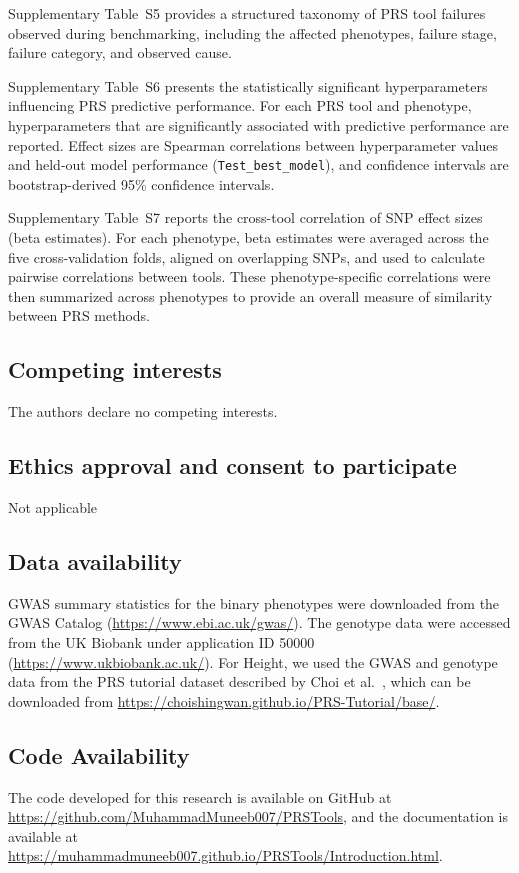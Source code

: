 \documentclass[pdflatex,sn-basic]{sn-jnl}
\begin{document}
Supplementary Table~S5 provides a structured taxonomy of PRS tool failures observed during benchmarking, including the affected phenotypes, failure stage, failure category, and observed cause.

Supplementary Table~S6 presents the statistically significant hyperparameters influencing PRS predictive performance. For each PRS tool and phenotype, hyperparameters that are significantly associated with predictive performance are reported. Effect sizes are Spearman correlations between hyperparameter values and held-out model performance (\texttt{Test\_best\_model}), and confidence intervals are bootstrap-derived 95\% confidence intervals.

Supplementary Table~S7 reports the cross-tool correlation of SNP effect sizes (beta estimates). For each phenotype, beta estimates were averaged across the five cross-validation folds, aligned on overlapping SNPs, and used to calculate pairwise correlations between tools. These phenotype-specific correlations were then summarized across phenotypes to provide an overall measure of similarity between PRS methods.



\subsection*{Competing interests}
The authors declare no competing interests.

\subsection*{Ethics approval and consent to participate}
Not applicable

\subsection*{Data availability }
GWAS summary statistics for the binary phenotypes were downloaded from the GWAS Catalog (\url{https://www.ebi.ac.uk/gwas/}). The genotype data were accessed from the UK Biobank under application ID 50000 (\url{https://www.ukbiobank.ac.uk/}). For Height, we used the GWAS and genotype data from the PRS tutorial dataset described by Choi et al.~\cite{Choi2020}, which can be downloaded from \url{https://choishingwan.github.io/PRS-Tutorial/base/}.

\subsection*{Code Availability}
The code developed for this research is available on GitHub at \url{https://github.com/MuhammadMuneeb007/PRSTools}, and the documentation is available at \url{https://muhammadmuneeb007.github.io/PRSTools/Introduction.html}.
\end{document}
